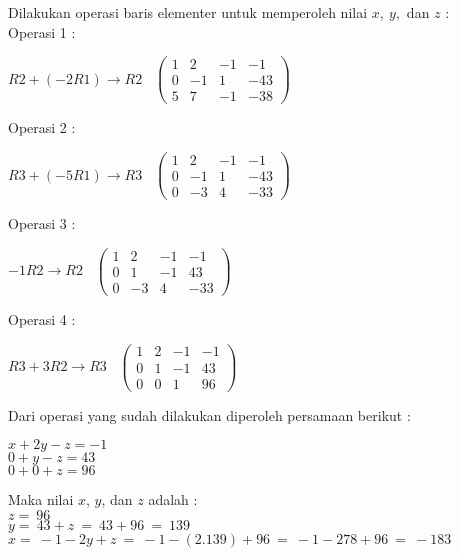 \documentclass[a4paper,twoside]{article}
\begin{document}
\begin{enumerate}
\begin{itemize}
Dilakukan operasi baris elementer untuk memperoleh nilai $x, \ y,$ dan $z$ : \\
Operasi 1 :
\begin{center}
$R2 + (-2R1) \rightarrow R2$ \ 
$\left(
\begin{array}{ccc|c}
 1 & 2 & -1 & -1 \\ 
 0 & -1 & 1 & -43 \\
 5 & 7 & -1 & -38
\end{array}
\right)$
\end{center}

Operasi 2 :
\begin{center}
$R3 + (-5R1) \rightarrow R3$ \ 
$\left(
\begin{array}{ccc|c}
 1 & 2 & -1 & -1 \\ 
 0 & -1 & 1 & -43 \\
 0 & -3 & 4 & -33
\end{array}
\right)$
\end{center}

Operasi 3 :
\begin{center}
$-1R2 \rightarrow R2$ \ 
$\left(
\begin{array}{ccc|c}
 1 & 2 & -1 & -1 \\ 
 0 & 1 & -1 & 43 \\
 0 & -3 & 4 & -33
\end{array}
\right)$
\end{center}

Operasi 4 :
\begin{center}
$R3 + 3R2 \rightarrow R3$ \ 
$\left(
\begin{array}{ccc|c}
 1 & 2 & -1 & -1 \\ 
 0 & 1 & -1 & 43 \\
 0 & 0 & 1 & 96
\end{array}
\right)$
\end{center}
\vspace{10pt}

Dari operasi yang sudah dilakukan diperoleh persamaan berikut :
\begin{center}
$x+2y-z=-1$ \\
$0+y-z=43$ \\
$0+0+z=96$ \\
\end{center}
\vspace{10pt}

Maka nilai $x$, $y$, dan $z$ adalah : \\
$z = \ 96$ \\
$y = \ 43 + z \ = \ 43 + 96 \ = \ 139$ \\
$x = \ -1 - 2y + z \ = \ -1 - (2.139) + 96 \ = \ -1 - 278 + 96 \ = \ -183$ \\


\end{itemize}
\end{enumerate}
\end{document}
